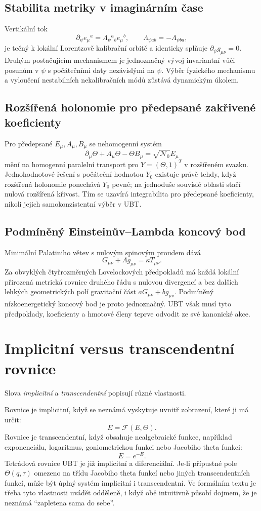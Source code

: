 \subsection{Stabilita metriky v imaginárním čase}
Vertikální tok
\[
 \partial_\psi e_\mu{}^a=\Lambda_\psi{}^a{}_b e_\mu{}^b,
 \qquad \Lambda_{\psi ab}=-\Lambda_{\psi ba},
\]
je tečný k lokální Lorentzově kalibrační orbitě a identicky splňuje
$\partial_\psi g_{\mu\nu}=0$. Druhým postačujícím mechanismem je jednoznačný
vývoj invariantní vůči posunům v $\psi$ s počátečními daty nezávislými na
$\psi$. Výběr fyzického mechanismu a vyloučení nestabilních nekalibračních
módů zůstává dynamickým úkolem.

\subsection{Rozšířená holonomie pro předepsané zakřivené koeficienty}
Pro předepsané $E_\mu,A_\mu,B_\mu$ se nehomogenní systém
\[
 \partial_\mu\Theta+A_\mu\Theta-\Theta B_\mu
 =\sqrt{\mathcal N_0}E_\mu
\]
mění na homogenní paralelní transport pro $Y=(\Theta,1)^T$ v rozšířeném
svazku. Jednohodnotové řešení s počáteční hodnotou $Y_0$ existuje právě tehdy,
když rozšířená holonomie ponechává $Y_0$ pevné; na jednoduše souvislé
oblasti stačí nulová rozšířená křivost. Tím se uzavírá integrabilita pro
předepsané koeficienty, nikoli jejich samokonzistentní výběr v UBT.

\subsection{Podmíněný Einsteinův--Lambda koncový bod}
Minimální Palatiniho větev s nulovým spinovým proudem dává
\[
 G_{\mu\nu}+\Lambda g_{\mu\nu}=\kappa T_{\mu\nu}.
\]
Za obvyklých čtyřrozměrných Lovelockových předpokladů má každá lokální
přirozená metrická rovnice druhého řádu s nulovou divergencí a bez dalších
lehkých geometrických polí gravitační část
$aG_{\mu\nu}+bg_{\mu\nu}$. Podmíněný nízkoenergetický koncový bod je proto
jednoznačný. UBT však musí tyto předpoklady, koeficienty a hmotové členy
teprve odvodit ze své kanonické akce.

\section{Implicitní versus transcendentní rovnice}
Slova \emph{implicitní} a \emph{transcendentní} popisují různé
vlastnosti.

Rovnice je implicitní, když se neznámá vyskytuje uvnitř zobrazení, které ji
má určit:
\[
 E=\mathcal F(E,\Theta).
\]
Rovnice je transcendentní, když obsahuje nealgebraické funkce, například
exponenciálu, logaritmus, goniometrickou funkci nebo Jacobiho theta funkci:
\[
 E=e^{-E}.
\]
Tetrádová rovnice UBT je již implicitní a diferenciální. Je-li přípustné
pole $\Theta(q,\tau)$ omezeno na třídu Jacobiho theta funkcí nebo jiných
transcendentních funkcí, může být úplný systém implicitní i transcendentní.
Ve formálním textu je třeba tyto vlastnosti uvádět odděleně, i když obě
intuitivně působí dojmem, že je neznámá ``zapletena sama do sebe''.

